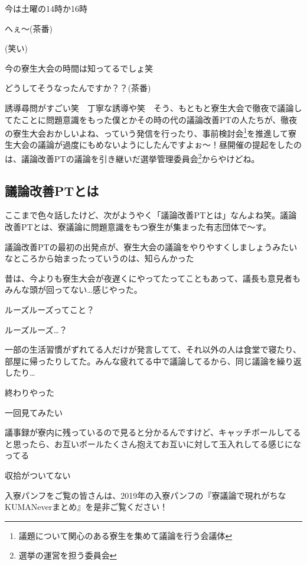 \begin{multicols}{2}
今は土曜の14時か16時

へぇ〜(茶番)

(笑い)

今の寮生大会の時間は知ってるでしょ笑

どうしてそうなったんですか？？(茶番)

誘導尋問がすごい笑　丁寧な誘導や笑　そう、もともと寮生大会で徹夜で議論してたことに問題意識をもった僕とかその時の代の議論改善PTの人たちが、徹夜の寮生大会おかしいよね、っていう発信を行ったり、事前検討会\footnote{議題について関心のある寮生を集めて議論を行う会議体}を推進して寮生大会の議論が過度にもめないようにしたんですよぉ〜！昼開催の提起をしたのは、議論改善PTの議論を引き継いだ選挙管理委員会\footnote{選挙の運営を担う委員会}からやけどね。

\subsection{議論改善PTとは}

ここまで色々話したけど、次がようやく「議論改善PTとは」なんよね笑。議論改善PTとは、寮議論に問題意識をもつ寮生が集まった有志団体で〜す。

議論改善PTの最初の出発点が、寮生大会の議論をやりやすくしましょうみたいなところから始まったっていうのは、知らんかった

昔は、今よりも寮生大会が夜遅くにやってたってこともあって、議長も意見者もみんな頭が回ってない…感じやった。

ルーズルーズってこと？

ルーズルーズ…？

一部の生活習慣がずれてる人だけが発言してて、それ以外の人は食堂で寝たり、部屋に帰ったりしてた。みんな疲れてる中で議論してるから、同じ議論を繰り返したり…

終わりやった

一回見てみたい

議事録が寮内に残っているので見ると分かるんですけど、キャッチボールしてると思ったら、お互いボールたくさん抱えてお互いに対して玉入れしてる感じになってる

収拾がついてない

入寮パンフをご覧の皆さんは、2019年の入寮パンフの『寮議論で現れがちなKUMANeverまとめ』を是非ご覧ください！


\end{multicols}
